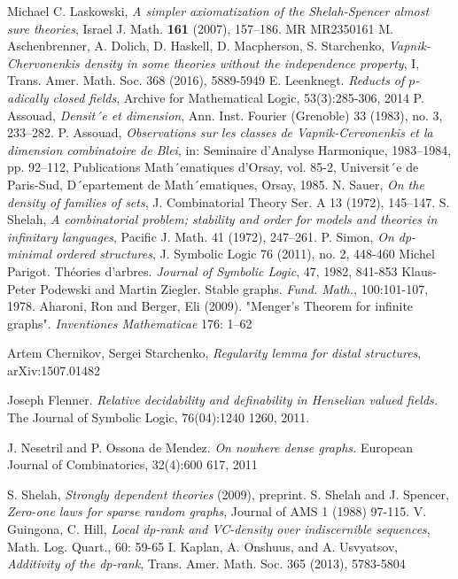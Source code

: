 
\begin{thebibliography}{9}
  
  Michael C. Laskowski, \textit{A simpler axiomatization of the Shelah-Spencer almost sure theories},
  Israel J. Math. \textbf{161} (2007), 157–186. MR MR2350161	
  M. Aschenbrenner, A. Dolich, D. Haskell, D. Macpherson, S. Starchenko,
  \textit{Vapnik-Chervonenkis density in some theories without the independence property}, I,
  Trans. Amer. Math. Soc. 368 (2016), 5889-5949
  E. Leenknegt. \textit{Reducts of $p$-adically closed fields}, Archive for Mathematical Logic, 53(3):285-306, 2014
  P. Assouad, \textit{Densit´e et dimension}, Ann. Inst. Fourier (Grenoble) 33 (1983), no. 3, 233–282.
  P. Assouad, \textit{Observations sur les classes de Vapnik-Cervonenkis et la dimension combinatoire de Blei},
  in: Seminaire d’Analyse Harmonique, 1983–1984, pp. 92–112, Publications Math´ematiques
  d’Orsay, vol. 85-2, Universit´e de Paris-Sud, D´epartement de Math´ematiques, Orsay, 1985.
  N. Sauer, \textit{On the density of families of sets}, J. Combinatorial Theory Ser. A 13 (1972), 145–147.
  S. Shelah, \textit{A combinatorial problem; stability and order for models and theories in infinitary languages},
  Pacific J. Math. 41 (1972), 247–261.
  P. Simon,
  \textit{On dp-minimal ordered structures},
  J. Symbolic Logic 76 (2011), no. 2, 448-460
  Michel Parigot.
  Th\'eories d'arbres.
  \textit{Journal of Symbolic Logic}, 47, 1982, 841-853
	Klaus-Peter Podewski and Martin Ziegler. Stable graphs. \textit{Fund. Math.}, 100:101-107, 1978.
	Aharoni, Ron and Berger, Eli (2009). "Menger's Theorem for infinite graphs". \textit{Inventiones Mathematicae} 176: 1–62

Artem Chernikov, Sergei Starchenko, \textit{Regularity lemma for distal structures}, 	arXiv:1507.01482

Joseph Flenner. \textit{Relative decidability and definability in Henselian valued fields.} The
Journal of Symbolic Logic, 76(04):1240 1260, 2011.
	
J. Nesetril and P. Ossona de Mendez. \textit{On nowhere dense graphs.} European Journal of
Combinatorics, 32(4):600 617, 2011

  S. Shelah, \textit{Strongly dependent theories} (2009), preprint.
  S. Shelah and J. Spencer, \textit{Zero-one laws for sparse random graphs}, Journal
of AMS 1 (1988) 97-115.  
  V. Guingona, C. Hill, \textit{Local dp-rank and VC-density over indiscernible sequences},
  Math. Log. Quart., 60: 59-65
  I. Kaplan, A. Onshuus, and A. Usvyatsov, \textit{Additivity of the dp-rank},
  Trans. Amer. Math. Soc. 365 (2013), 5783-5804

\end{thebibliography}

